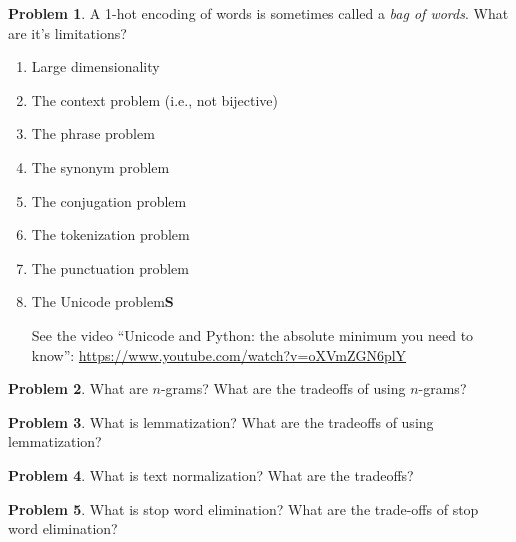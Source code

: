 \documentclass[10pt]{article}
\theoremstyle{definition}
\newtheorem{problem}{Problem}
\begin{document}
\newpage
\begin{problem}
    A 1-hot encoding of words is sometimes called a \emph{bag of words}.
    What are it's limitations?
    \begin{enumerate}
        \item Large dimensionality
            \vspace{3in}
            \newpage
        \item The context problem (i.e., not bijective)
            \vspace{3in}
        \item The phrase problem
            \vspace{3in}
        \item The synonym problem
            \vspace{3in}
        \item The conjugation problem
            \vspace{3in}
        \item The tokenization problem
            \vspace{3in}
        \item The punctuation problem
            \vspace{3in}
        \item The Unicode problem\textbf{S}
            
            See the video ``Unicode and Python: the absolute minimum you need to know'': \url{https://www.youtube.com/watch?v=oXVmZGN6plY}
    \end{enumerate}
\end{problem}

\newpage
\begin{problem}
    What are $n$-grams?
    What are the tradeoffs of using $n$-grams?
\end{problem}

\newpage
\begin{problem}
    What is lemmatization?
    What are the tradeoffs of using lemmatization?
\end{problem}

\newpage
\begin{problem}
    What is text normalization?
    What are the tradeoffs?
\end{problem}

\newpage
\begin{problem}
    What is stop word elimination?
    What are the trade-offs of stop word elimination?
\end{problem}
\end{document}
